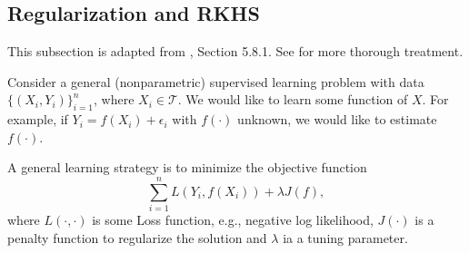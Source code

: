 \documentclass[11pt]{article}
\theoremstyle{plain}
\theoremstyle{definition}
\theoremstyle{remark}
\begin{document}
\subsection{Regularization and RKHS}
This subsection is adapted from \cite{book:25295}, Section 5.8.1.
See \cite{book:1273182} for more thorough treatment.


Consider a general (nonparametric) supervised learning problem with data $\{(X_i,Y_i)\}_{i=1}^n$, where $X_i \in \mathcal T$.
We would like to learn some function of $X$.
For example, if $Y_i = f(X_i)+\epsilon_i$ with $f(\cdot)$ unknown, we would like to estimate $f(\cdot)$.

A general learning strategy is to minimize the objective function
\begin{equation*}
    \sum_{i=1}^n L(Y_i, f(X_i)) + \lambda J(f),
\end{equation*}
where $L(\cdot,\cdot)$ is some Loss function, e.g., negative log likelihood, $J(\cdot)$ is a penalty function to regularize the solution and $\lambda$ ia a tuning parameter.
\end{document}
